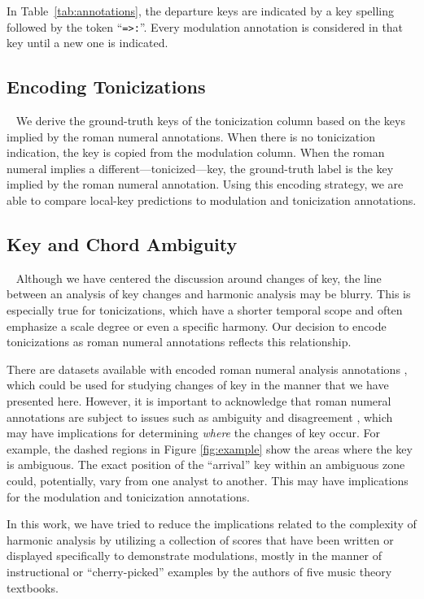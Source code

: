 \documentclass[sigconf]{acmart}
\begin{document}
In Table~\ref{tab:annotations}, the departure keys are indicated by a key spelling followed by the token ``\texttt{=>:}''. 
Every modulation annotation is considered in that key until a new one is indicated.

\subsection{Encoding Tonicizations}~\label{sec:tonicization}
We derive the ground-truth keys of the tonicization column based on the keys implied by the roman numeral annotations.
When there is no tonicization indication, the key is copied from the modulation column.
When the roman numeral implies a different---tonicized---key, the ground-truth label is the key implied by the roman numeral annotation. Using this encoding strategy, we are able to compare local-key predictions to modulation and tonicization annotations. 

\subsection{Key and Chord Ambiguity}~\label{sec:ambiguity}
Although we have centered the discussion around changes of key, the line between an analysis of key changes and harmonic analysis may be blurry. 
This is especially true for tonicizations, which have a shorter temporal scope and often emphasize a scale degree or even a specific harmony. 
Our decision to encode tonicizations as roman numeral annotations reflects this relationship.

There are datasets available with encoded roman numeral analysis annotations \cite{neuwirth2018annotated, devaney2015tavern, Tymoczko2019}, which could be used for studying changes of key in the manner that we have presented here. 
However, it is important to acknowledge that roman numeral annotations are subject to issues such as ambiguity and disagreement \cite{condit-schultz2018, koops19, selway2020, arthur2017harmony}, which may have implications for determining \emph{where} the changes of key occur. 
For example, the dashed regions in Figure \ref{fig:example} show the areas where the key is ambiguous. The exact position of the ``arrival'' key within an ambiguous zone could, potentially, vary from one analyst to another. This may have implications for the modulation and tonicization annotations.

In this work, we have tried to reduce the implications related to the complexity of harmonic analysis by utilizing a collection of scores that have been written or displayed specifically to demonstrate modulations, mostly in the manner of instructional or ``cherry-picked'' examples by the authors of five music theory textbooks. 
\end{document}
